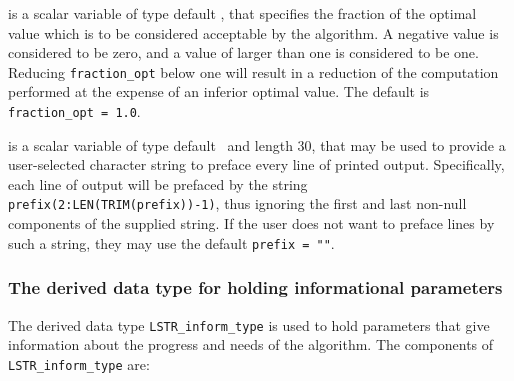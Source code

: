 \documentclass{galahad}
\newcommand{\packagename}{LS\-TR}
\begin{document}
\begin{description}
 is a scalar variable of type default
\realdp, that specifies the fraction
of the optimal value which is to be considered acceptable by the algorithm.
A negative value is considered to be zero, and a value of larger than one
is considered to be one. Reducing {\tt fraction\_opt} below one will result
in a reduction of the computation performed at the expense of an inferior
optimal value.
The default is {\tt fraction\_opt = 1.0}.

 is a scalar variable of type default \character\
and length 30, that may be used to provide a user-selected
character string to preface every line of printed output.
Specifically, each line of output will be prefaced by the string
{\tt prefix(2:LEN(TRIM(prefix))-1)},
thus ignoring the first and last non-null components of the
supplied string. If the user does not want to preface lines by such
a string, they may use the default {\tt prefix = ""}.

\end{description}


\subsubsection{The derived data type for holding informational
 parameters}\label{typeinform}
The derived data type
{\tt \packagename\_inform\_type}
is used to hold parameters that give information about the progress and needs
of the algorithm. The components of
{\tt \packagename\_inform\_type}
are:
\end{document}
